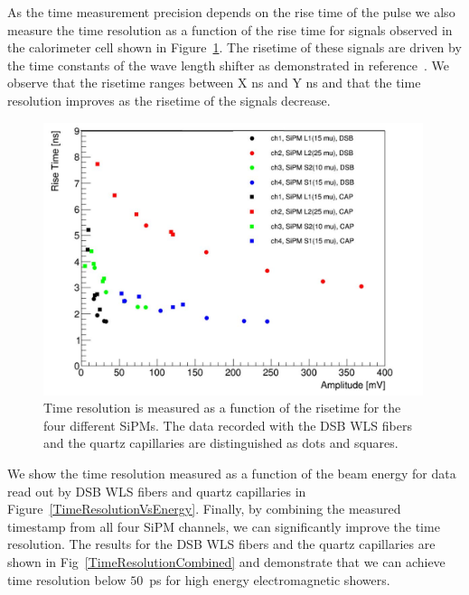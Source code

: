 As the time measurement precision depends on the rise time of the pulse we also
measure the time resolution as a function of the rise time for signals observed 
in the calorimeter cell shown in Figure~\ref{RiseTime}. The risetime of these signals 
are driven by the time constants of the wave length shifter as 
demonstrated in reference~\cite{lysotiming}. We observe that the risetime
ranges between X ns and Y ns and that the time resolution improves as the 
risetime of the signals decrease. 

%
\begin{figure}[htb]
\includegraphics[width=0.99\textwidth]{RiseTime.pdf}
\caption{\label{RiseTime}Time resolution is measured as a function of the risetime
for the four different SiPMs. The data recorded with the DSB WLS fibers and the
quartz capillaries are distinguished as dots and squares. }
\end{figure}
%


We show the time resolution measured as a function of the beam energy for
data read out by DSB WLS fibers and quartz capillaries in 
Figure~\ref{TimeResolutionVsEnergy}. Finally, by combining the measured timestamp
from all four SiPM channels, we can significantly improve the time resolution.
The results for the DSB WLS fibers and the quartz capillaries are shown in
Fig~\ref{TimeResolutionCombined} and demonstrate that we can achieve time resolution
below $50$~ps for high energy electromagnetic showers.

